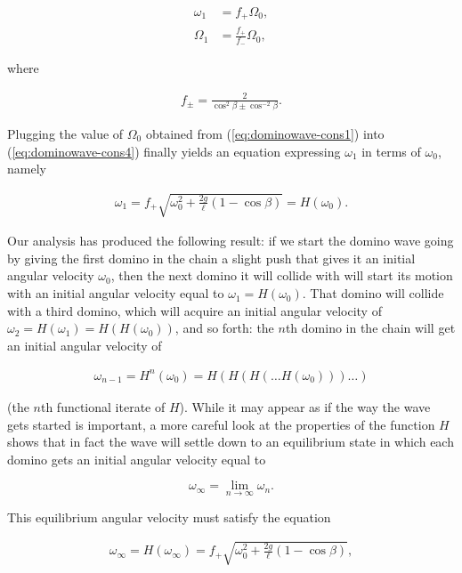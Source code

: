\documentclass[11pt]{report}
\theoremstyle{plain}
\theoremstyle{definition}
\begin{document}
\begin{equation*} \tag{28}\label{eq:dominowave-cons4}
\begin{split}
\omega_1 &= f_+ \Omega_0, \\
\Omega_1 &= \frac{f_+}{f_-} \Omega_0,
\end{split}
\end{equation*}

where

\begin{align*}
f_{\pm} = \frac{2}{\cos^2 \beta \pm \cos^{-2}\beta}.
\end{align*}

Plugging the value of $\Omega_0$ obtained from
(\ref{eq:dominowave-cons1}) into (\ref{eq:dominowave-cons4})
finally yields an equation expressing $\omega_1$ in
terms of $\omega_0$, namely

\begin{align*}
\omega_1 = f_+ \sqrt{\omega_0^2 + \frac{2g}{\ell}(1-\cos \beta)} = H(\omega_0).
\end{align*}

Our analysis has produced the following result: if we
start the domino wave going by giving the first domino
in the chain a slight push that gives it an initial
angular velocity $\omega_0$, then the next domino it
will collide with will start its motion with an
initial angular velocity equal to
$\omega_1=H(\omega_0)$. That domino will collide with
a third domino, which will acquire an initial angular
velocity of $\omega_2=H(\omega_1)=H(H(\omega_0))$,
and so forth: the $n$th domino in the chain will get
an initial angular velocity of

\begin{align*}
\omega_{n-1} = H^{n}(\omega_0) = H(H(H(\ldots H(\omega_0)))\ldots)
\end{align*}

(the $n$th functional iterate of $H$). While it may
appear as if the way the wave gets started is
important, a more careful look at the properties of
the function $H$ shows that in fact the wave will
settle down to an equilibrium state in which each
domino gets an initial angular velocity equal to

\[
\omega_\infty = \lim_{n\to\infty} \omega_n.
\]

This equilibrium angular velocity must satisfy the
equation

\begin{align*}
\omega_\infty = H(\omega_\infty) = f_+ \sqrt{\omega_0^2 + \frac{2g}{\ell}(1-\cos \beta)},
\end{align*}
\end{document}
